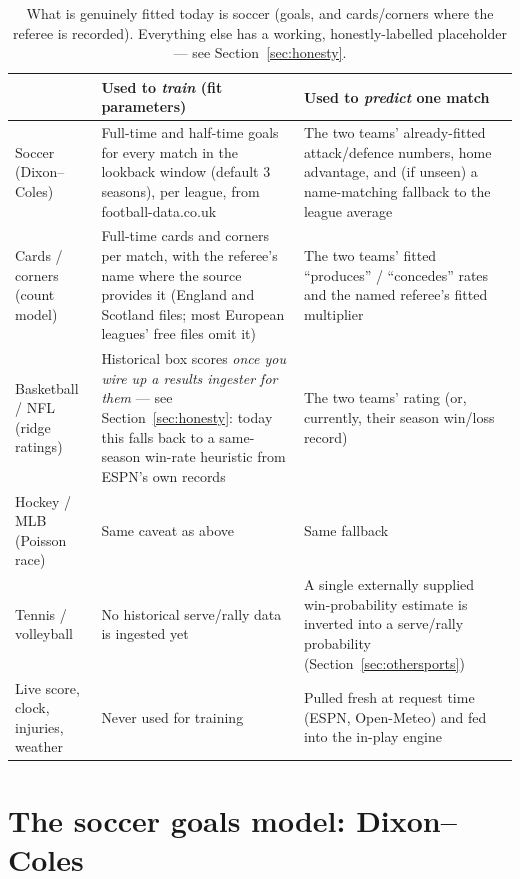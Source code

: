 \documentclass[11pt]{article}
\begin{document}
\begin{table}[h]
\centering
\small
\begin{tabular}{@{}p{4.3cm}p{5.3cm}p{5.6cm}@{}}
\toprule
& \textbf{Used to \emph{train} (fit parameters)} & \textbf{Used to \emph{predict} one match} \\
\midrule
Soccer (Dixon--Coles) &
Full-time and half-time goals for every match in the lookback window (default 3 seasons), per
league, from football-data.co.uk &
The two teams' already-fitted attack/defence numbers, home advantage, and (if unseen) a
name-matching fallback to the league average \\[4pt]
Cards / corners (count model) &
Full-time cards and corners per match, with the referee's name where the source provides it
(England and Scotland files; most European leagues' free files omit it) &
The two teams' fitted ``produces'' / ``concedes'' rates and the named referee's fitted multiplier
\\[4pt]
Basketball / NFL (ridge ratings) &
Historical box scores \emph{once you wire up a results ingester for them} --- see
Section~\ref{sec:honesty}: today this falls back to a same-season win-rate heuristic from ESPN's
own records &
The two teams' rating (or, currently, their season win/loss record) \\[4pt]
Hockey / MLB (Poisson race) &
Same caveat as above &
Same fallback \\[4pt]
Tennis / volleyball &
No historical serve/rally data is ingested yet &
A single externally supplied win-probability estimate is inverted into a serve/rally probability
(Section~\ref{sec:othersports}) \\[4pt]
Live score, clock, injuries, weather &
Never used for training &
Pulled fresh at request time (ESPN, Open-Meteo) and fed into the in-play engine \\
\bottomrule
\end{tabular}
\caption{What is genuinely fitted today is soccer (goals, and cards/corners where the referee is
recorded). Everything else has a working, honestly-labelled placeholder --- see
Section~\ref{sec:honesty}.}
\end{table}

\section{The soccer goals model: Dixon--Coles}
\label{sec:dixoncoles}
\end{document}
